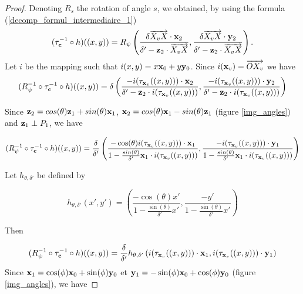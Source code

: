 \begin{proof}
Denoting $R_{s}$ the rotation of angle $s$, we obtained, by using the formula (\ref{decomp_formul_intermediaire_1}) 
\begin{equation*}
(\tau_{\mathbf{c}}^{-1} \circ h)((x,y)) = R_{\psi}\left(\frac{\delta \overrightarrow{X_v X}\cdot \mathbf{x}_{2} }{\delta'-\mathbf{z}_2 \cdot \overrightarrow{X_v X}},\frac{\delta \overrightarrow{X_v X}\cdot \mathbf{y}_{2}}{\delta'-\mathbf{z}_2 \cdot \overrightarrow{X_v X}}  \right).
\end{equation*}
Let $i$ be the mapping such that $i(x,y)=x \mathbf{x}_0 + y \mathbf{y}_0$. Since $i(\mathbf{x}_v)=\overrightarrow{O X_v}$ we have
\begin{equation*}
(R_{\psi}^{-1} \circ \tau_{\mathbf{c}}^{-1}  \circ h)((x,y))=\delta \left(\frac{-i(\tau_{\mathbf{x}_v} ((x,y)))\cdot \mathbf{x}_{2} }{\delta'-\mathbf{z}_2 \cdot i(\tau_{\mathbf{x}_v} ((x,y)))},\frac{-i(\tau_{\mathbf{x}_v} ((x,y)))\cdot \mathbf{y}_{2}}{\delta'-\mathbf{z}_2 \cdot i(\tau_{\mathbf{x}_v} ((x,y)))}  \right) 
\end{equation*}

Since $\mathbf{z}_{2}=cos(\theta)\mathbf{z}_{1}+sin(\theta)\mathbf{x}_{1}$, $\mathbf{x}_{2}=cos(\theta)\mathbf{x}_{1}-sin(\theta)\mathbf{z}_{1}$ (figure \ref{img_angles}) and $\mathbf{z}_{1}\perp P_{1}$, we have

\begin{equation*}
(R_{\psi}^{-1} \circ \tau_{\mathbf{c}}^{-1}  \circ h)((x,y))=\frac{\delta}{\delta'}\left(\frac{-\cos(\theta)i(\tau_{\mathbf{x}_v} ((x,y)))\cdot \mathbf{x}_{1} }{1-\frac{sin(\theta)}{\delta'}\mathbf{x}_{1}\cdot i(\tau_{\mathbf{x}_v}((x,y)))}, \frac{-i(\tau_{\mathbf{x}_v} ((x,y)))\cdot \mathbf{y}_{1}}{1-\frac{sin(\theta)}{\delta'}\mathbf{x}_{1}\cdot i(\tau_{\mathbf{x}_v}((x,y)))}  \right) 
\end{equation*}

Let $h_{\theta,\delta'}$ be defined by

\begin{equation*}
h_{\theta,\delta'}(x',y')=\left(\frac{-\cos(\theta)x'}{1-\frac{\sin(\theta)}{\delta'}x'} ,\frac{-y'}{1-\frac{\sin(\theta)}{\delta'}x'}\right)
\end{equation*}

Then

\begin{equation*}
(R_{\psi}^{-1} \circ \tau_{\mathbf{c}}^{-1} \circ h)((x,y))= \frac{\delta}{\delta'}h_{\theta,\delta'}\left ( i(\tau_{\mathbf{x}_v}((x,y))) \cdot \mathbf{x}_{1}, i(\tau_{\mathbf{x}_v}((x,y))) \cdot \mathbf{y}_{1}\right)
\end{equation*}
\label{figure_de_rotations_18}
Since $\mathbf{x}_{1}=\cos(\phi)\mathbf{x}_{0}+\sin(\phi)\mathbf{y}_{0}$ et $\mathbf{y}_{1}=-\sin(\phi)\mathbf{x}_{0}+\cos(\phi)\mathbf{y}_{0}$ (figure \ref{img_angles}), we have


\end{proof}

